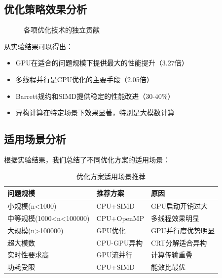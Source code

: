 \documentclass[a4paper]{article}
\begin{document}
	\subsection{优化策略效果分析}
	\begin{figure}[H]
		\centering
		\caption{各项优化技术的独立贡献}
	\end{figure}
	
	从实验结果可以得出：
	\begin{itemize}
		\item GPU在适合的问题规模下提供最大的性能提升（3.27倍）
		\item 多线程并行是CPU优化的主要手段（2.05倍）
		\item Barrett规约和SIMD提供稳定的性能改进（30-40\%）
		\item 异构计算在特定场景下效果显著，特别是大模数计算
	\end{itemize}
	\subsection{适用场景分析}
	根据实验结果，我们总结了不同优化方案的适用场景：
	\begin{table}[H]
		\centering
		\caption{优化方案适用场景推荐}
		\begin{tabular}{|l|l|l|}
			\hline
			\textbf{问题规模} & \textbf{推荐方案} & \textbf{原因} \\
			\hline
			小规模(n<1000) & CPU+SIMD & GPU启动开销过大 \\
			\hline
			中等规模(1000<n<100000) & CPU+OpenMP & 多线程效果明显 \\
			\hline
			大规模(n>100000) & GPU优化 & GPU并行度优势明显 \\
			\hline
			超大模数 & CPU-GPU异构 & CRT分解适合异构 \\
			\hline
			实时性要求高 & GPU流并行 & 计算传输重叠 \\
			\hline
			功耗受限 & CPU+SIMD & 能效比最优 \\
			\hline
		\end{tabular}
	\end{table}
\end{document}
